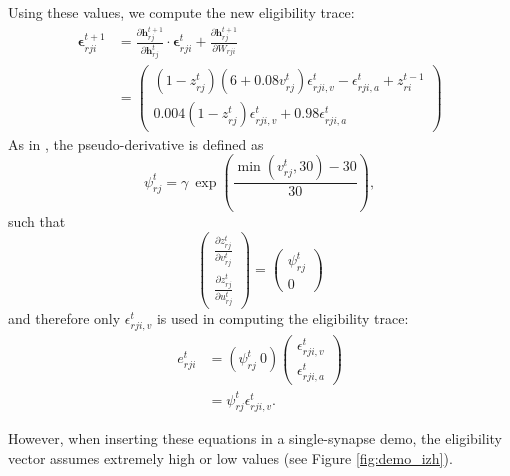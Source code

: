 			Using these values, we compute the new eligibility trace:
	        \begin{align}
	        \bm{\epsilon}^{t+1}_{rji} &= \frac{\partial\mathbf{h}^{t+1}_{rj}}{\partial\mathbf{h}^t_{rj}}\cdot\bm{\epsilon}^t_{rji} + \frac{\partial\mathbf{h}^{t+1}_{rj}}{\partial W_{rji}}\\
	        &= \begin{pmatrix}\left(1-z^t_{rj}\right)\left(6+0.08v^t_{rj}\right)\epsilon^t_{rji, v} -\epsilon^t_{rji, a} + z_{ri}^{t-1}\\
	        0.004\left(1-z^t_{rj}\right)\epsilon^t_{rji, v} + 0.98\epsilon^t_{rji, a}
	        \end{pmatrix}\label{eq:ml_izhikevich_evector}
	        \end{align}
	        As in \citet{traub2020learning}, the pseudo-derivative is defined as
	        \begin{equation}
	        \psi^t_{rj} = \gamma\ \exp\left(\frac{\min\left(v^t_{rj}, 30\right) - 30}{30}\right),
	        \end{equation}
	        such that
	        \begin{equation}
	        \begin{pmatrix}\frac{\partial z^t_{rj}}{\partial v^t_{rj}}\\\frac{\partial z^t_{rj}}{\partial u^t_{rj}}\end{pmatrix}
	        = \begin{pmatrix}\psi^t_{rj}\\0\end{pmatrix}
	        \end{equation}
	        and therefore only $\epsilon^t_{rji, v}$ is used in computing the eligibility trace:
	        \begin{align}
	        e^t_{rji} &= \left(\psi^t_{rj}\ 0\right)\begin{pmatrix}\epsilon^t_{rji, v}\\\epsilon^t_{rji, a}\end{pmatrix} \\
	        &= \psi^t_{rj}\epsilon^t_{rji, v}.
	        \end{align}

	    However, when inserting these equations in a single-synapse demo, the eligibility vector assumes extremely high or low values (see Figure \ref{fig:demo_izh}).

